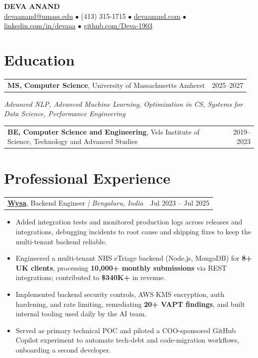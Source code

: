 \documentclass[letterpaper,11pt]{article}
\makeatletter
\newcommand{\eduItem}[3]{%
  \begin{tabular*}{\textwidth}{@{}l@{\extracolsep{\fill}}r@{}}
    \textbf{#1}, #2 & #3 \\
  \end{tabular*}\par
}
\newcommand{\expItem}[4]{%
  \vspace{3pt}
  \begin{tabular*}{\textwidth}{@{}l@{\extracolsep{\fill}}r@{}}
    \textbf{#1}, #2 \textit{| #3} & #4 \\
  \end{tabular*}\par\vspace{-2pt}
}
\makeatother
\begin{document}
\begin{center}
    {\fontsize{18}{20}\selectfont\bfseries DEVA ANAND}\\ \vspace{3pt}
    {\small
    \href{mailto:devaanand@umass.edu}{devaanand@umass.edu}
    \enspace$\bullet$\enspace
    (413) 315-1715
    \enspace$\bullet$\enspace
    \href{https://devaanand.com}{devaanand.com}
    \enspace$\bullet$\enspace
    \href{https://linkedin.com/in/devaaa/}{linkedin.com/in/devaaa}
    \enspace$\bullet$\enspace
    \href{https://github.com/Deva-1903}{github.com/Deva-1903}}
\end{center}
\vspace{-6pt}

\section{Education}
\eduItem{MS, Computer Science}{University of Massachusetts Amherst}{2025--2027}
{\small\textit{Advanced NLP, Advanced Machine Learning, Optimization in CS, Systems for Data Science, Performance Engineering}}\par
\vspace{3pt}
\eduItem{BE, Computer Science and Engineering}{Vels Institute of Science, Technology and Advanced Studies}{2019--2023}

\section{Professional Experience}

\expItem{\href{https://www.wysa.io}{Wysa}}{Backend Engineer}{Bengaluru, India}{Jul 2023 -- Jul 2025}
\begin{itemize}
  \item Added integration tests and monitored production logs across releases and integrations, debugging incidents to root cause and shipping fixes to keep the multi-tenant backend reliable.
  \item Engineered a multi-tenant NHS eTriage backend (Node.js, MongoDB) for \textbf{8+ UK clients}, processing \textbf{10{,}000+ monthly submissions} via REST integrations; contributed to \textbf{\$340K+} in revenue.
  \item Implemented backend security controls, AWS KMS encryption, auth hardening, and rate limiting, remediating \textbf{20+ VAPT findings}, and built internal tooling used daily by the AI team.
  \item Served as primary technical POC and piloted a COO-sponsored GitHub Copilot experiment to automate tech-debt and code-migration workflows, onboarding a second developer.
\end{itemize}
\end{document}
